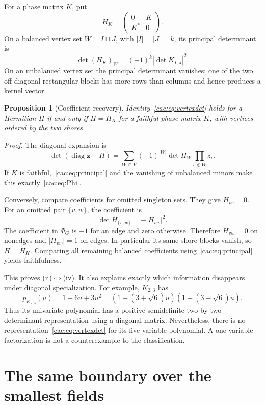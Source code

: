 \documentclass[11pt]{article}
\numberwithin{equation}{section}
\newtheorem{proposition}[theorem]{Proposition}
\theoremstyle{definition}
\newcommand{\diag}{\operatorname{diag}}
\newcommand{\zv}{\mathbf z}
\begin{document}
For a phase matrix $K$, put
\[
 H_K=\begin{pmatrix}0&K\\K^*&0\end{pmatrix}.
\]
On a balanced vertex set $W=I\sqcup J$, with $|I|=|J|=k$, its principal determinant is
\begin{equation}
 \det (H_K)_W=(-1)^k|\det K_{I,J}|^2.
 \label{cac:eq:principal}
\end{equation}
On an unbalanced vertex set the principal determinant vanishes: one of the two off-diagonal rectangular blocks has more rows than columns and hence produces a kernel vector.

\begin{proposition}[Coefficient recovery]
\label{cac:prop:hermitian}
Identity~\eqref{cac:eq:vertexdet} holds for a Hermitian $H$ if and only if $H=H_K$ for a faithful phase matrix $K$, with vertices ordered by the two shores.
\end{proposition}
\begin{proof}
The diagonal expansion is
\begin{equation}
 \det(\diag\zv-H)
 =\sum_{W\subseteq V}(-1)^{|W|}\det H_W
                         \prod_{v\notin W}z_v.
 \label{cac:eq:diagexpansion}
\end{equation}
If $K$ is faithful,~\eqref{cac:eq:principal} and the vanishing of unbalanced minors make this exactly~\eqref{cac:eq:Phi}.

Conversely, compare coefficients for omitted singleton sets. They give $H_{vv}=0$. For an omitted pair $\{v,w\}$, the coefficient is
\[
 \det H_{\{v,w\}}=-|H_{vw}|^2.
\]
The coefficient in $\Phi_G$ is $-1$ for an edge and zero otherwise. Therefore $H_{vw}=0$ on nonedges and $|H_{vw}|=1$ on edges. In particular its same-shore blocks vanish, so $H=H_K$. Comparing all remaining balanced coefficients using~\eqref{cac:eq:principal} yields faithfulness.
\end{proof}

This proves (ii)$\Leftrightarrow$(iv). It also explains exactly which information disappears under diagonal specialization. For example, $K_{2,3}$ has
\[
 p_{K_{2,3}}(u)=1+6u+3u^2
 =(1+(3+\sqrt6)u)(1+(3-\sqrt6)u).
\]
Thus its univariate polynomial has a positive-semidefinite two-by-two determinant representation using a diagonal matrix. Nevertheless, there is no representation~\eqref{cac:eq:vertexdet} for its five-variable polynomial. A one-variable factorization is not a counterexample to the classification.

\section{The same boundary over the smallest fields}
\label{cac:sec:finitefields}
\end{document}
